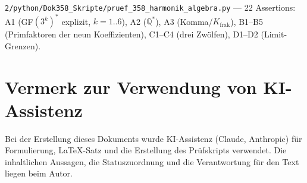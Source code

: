 \texttt{2/python/Dok358\_Skripte/pruef\_358\_harmonik\_algebra.py} ---
22 Assertions: A1 (GF$(3^k)^*$ explizit, $k=1..6$), A2 ($\mathbb{Q}^*$),
A3 (Komma/$K_\text{frak}$), B1--B5 (Primfaktoren der neun Koeffizienten),
C1--C4 (drei Zwölfen), D1--D2 (Limit-Grenzen).

\section*{Vermerk zur Verwendung von KI-Assistenz}

Bei der Erstellung dieses Dokuments wurde KI-Assistenz (Claude, Anthropic)
für Formulierung, LaTeX-Satz und die Erstellung des Prüfskripts
verwendet. Die inhaltlichen Aussagen, die Statuszuordnung und die
Verantwortung für den Text liegen beim Autor.
